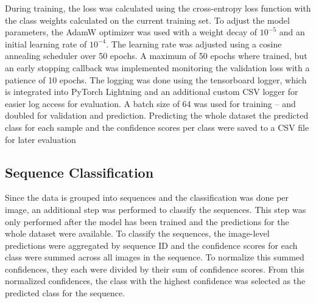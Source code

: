     During training, the loss was calculated using the cross-entropy loss function with the class weights calculated on the current training set.
    To adjust the model parameters, the AdamW optimizer \autocite{loshchilovDecoupledWeightDecay2019} was used with a weight decay of $10^{-5}$ and an initial learning rate of $10^{-4}$.
    The learning rate was adjusted using a cosine annealing scheduler \autocite{loshchilovSGDRStochasticGradient2017} over 50 epochs.
    A maximum of 50 epochs where trained, but an early stopping callback was implemented monitoring the validation loss with a patience of 10 epochs.
    The logging was done using the tensorboard logger, which is integrated into PyTorch Lightning and an additional custom CSV logger for easier log access for evaluation.
    A batch size of 64 was used for training -- and doubled for validation and prediction.
    Predicting the whole dataset the predicted class for each sample and the confidence scores per class were saved to a CSV file for later evaluation

    \subsection{Sequence Classification} 
    Since the data is grouped into sequences and the classification was done per image, an additional step was performed to classify the sequences.
    This step was only performed after the model has been trained and the predictions for the whole dataset were available.
    To classify the sequences, the image-level predictions were aggregated by sequence ID and the confidence scores for each class were summed across all images in the sequence.
    To normalize this summed confidences, they each were divided by their sum of confidence scores.
    From this normalized confidences, the class with the highest confidence was selected as the predicted class for the sequence.
    

